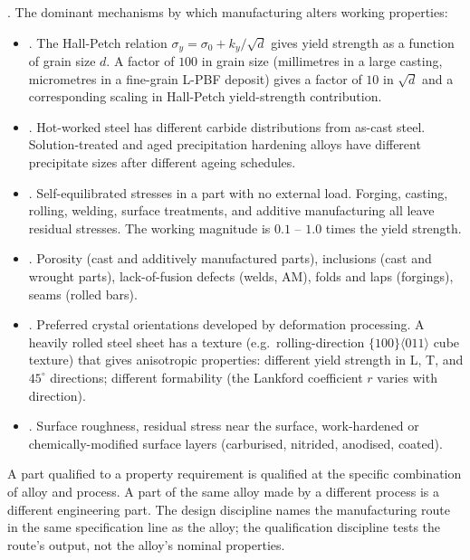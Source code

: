 . The dominant
mechanisms by which manufacturing alters working properties:

\begin{itemize}[leftmargin=*]
\item {}. The Hall-Petch relation $\sigma_y =
  \sigma_0 + k_y / \sqrt{d}$ gives yield strength as a function of
  grain size $d$. A factor of $100$ in grain size (millimetres in a
  large casting, micrometres in a fine-grain L-PBF deposit) gives a
  factor of $10$ in $\sqrt{d}$ and a corresponding scaling in
  Hall-Petch yield-strength contribution.
\item {}. Hot-worked
  steel has different carbide distributions from as-cast steel.
  Solution-treated and aged precipitation hardening alloys have
  different precipitate sizes after different ageing schedules.
\item {}. Self-equilibrated stresses in a
  part with no external load. Forging, casting, rolling, welding,
  surface treatments, and additive manufacturing all leave residual
  stresses. The working magnitude is $0.1$ -- $1.0$ times the yield
  strength.
\item {}. Porosity (cast and additively manufactured
  parts), inclusions (cast and wrought parts), lack-of-fusion defects
  (welds, AM), folds and laps (forgings), seams (rolled bars).
\item {}. Preferred crystal
  orientations developed by deformation processing. A heavily rolled
  steel sheet has a texture (e.g.\ rolling-direction $\{100\}\langle011\rangle$
  cube texture) that gives anisotropic properties: different yield
  strength in L, T, and $45^\circ$ directions; different formability
  (the Lankford coefficient $r$ varies with direction).
\item {}. Surface roughness, residual stress
  near the surface, work-hardened or chemically-modified surface
  layers (carburised, nitrided, anodised, coated).
\end{itemize}

\begin{principle}
A part qualified to a property requirement is qualified at the
specific combination of alloy and process. A part of the same alloy
made by a different process is a different engineering part. The
design discipline names the manufacturing route in the same
specification line as the alloy; the qualification discipline tests
the route's output, not the alloy's nominal properties.
\end{principle}

